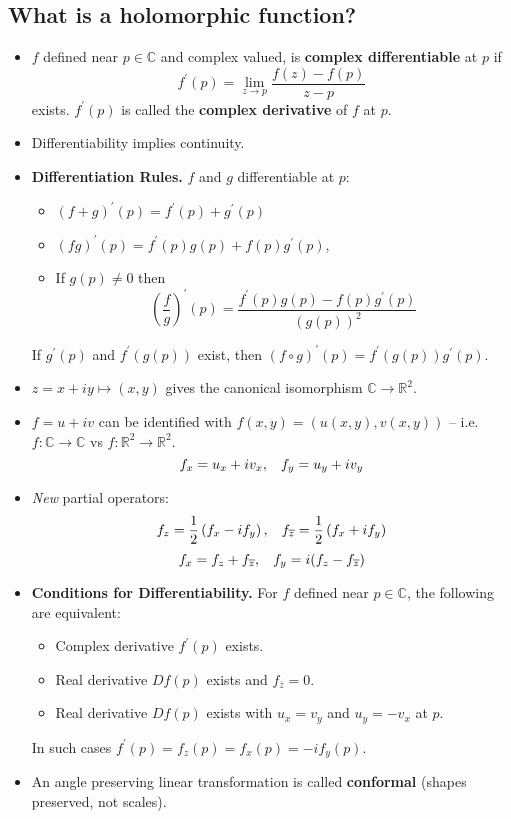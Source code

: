 \documentclass{article}
\newenvironment{topic}[1]{%
{\subsection{#1}}%
\begin{itemize}%
}{%
\end{itemize}%
}
\newcommand{\theorem}[1]{\item {\bf #1.}}
\newcommand{\term}[1]{{\bf #1}}
\newcommand{\remark}{\item}
\begin{document}
\begin{topic}{What is a holomorphic function?}

\remark $f$ defined near $p \in \mathbb{C}$ and complex valued, is \term{complex differentiable} at $p$ if $$f^\prime(p) = \lim_{z \to p} \dfrac{f(z) - f(p)}{z - p}$$ exists. $f^\prime(p)$ is called the \term{complex derivative} of $f$ at $p$.

\remark Differentiability implies continuity.

\theorem{Differentiation Rules} $f$ and $g$ differentiable at $p$:
\begin{itemize}
\item $(f + g)^\prime(p) = f^\prime(p) + g^\prime(p)$
\item $(fg)^\prime(p) = f^\prime(p)g(p) + f(p)g^\prime(p)$,
\item If $g(p) \neq 0$ then $$\left(\frac{f}{g}\right)^\prime(p) = \dfrac{f^\prime(p)g(p) - f(p)g^\prime(p)}{(g(p))^2}$$
\end{itemize}
If $g^\prime(p)$ and $f^\prime(g(p))$ exist, then $(f \circ g)^\prime(p) = f^\prime(g(p)) g^\prime(p)$.

\remark $z = x + iy \mapsto (x, y)$ gives the canonical isomorphism $\mathbb{C} \to \mathbb{R}^2$.

\remark $f = u + iv$ can be identified with $f(x, y) = (u(x, y), v(x, y))$ -- i.e. $f : \mathbb{C} \to \mathbb{C}$ vs $f : \mathbb{R}^2 \to \mathbb{R}^2$.
$$f_x = u_x + i v_x, \hskip 0.3cm f_y = u_y + i v_y$$

\remark {\em New} partial operators: 
$$f_z = \frac{1}{2}\left(f_x - i f_y\right), \hskip 0.3cm f_{\overline{z}} = \frac{1}{2}\left(f_x + i f_y\right)$$
$$f_x = f_z + f_{\overline{z}}, \hskip 0.3cm f_y = i(f_z - f_{\overline{z}})$$

\theorem{Conditions for Differentiability} For $f$ defined near $p \in \mathbb{C}$, the following are equivalent:
\begin{itemize}
\item Complex derivative $f^\prime(p)$ exists.
\item Real derivative $Df(p)$ exists and $f_{\overline{z}} = 0$.
\item Real derivative $Df(p)$ exists with $u_x = v_y$ and $u_y = -v_x$ at $p$.
\end{itemize}
In such cases $f^\prime(p) = f_z(p) = f_x(p) = -i f_y(p)$.

\remark An angle preserving linear transformation is called \term{conformal} (shapes preserved, not scales).


\end{topic}
\end{document}
